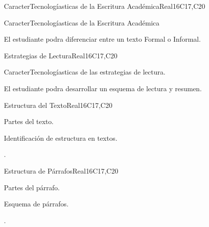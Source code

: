 \begin{syllabus}
\begin{unit}{CaracterTecnologíasticas de la Escritura Académica}{}{Real}{16}{C17,C20}
  \begin{topics}
      \item CaracterTecnologíasticas de la Escritura Académica
  \end{topics}

  \begin{learningoutcomes}
   \item El estudiante podra diferenciar entre un texto Formal o Informal.
  \end{learningoutcomes}
\end{unit}

\begin{unit}{Estrategias de Lectura}{}{Real}{16}{C17,C20}
  \begin{topics}
      \item CaracterTecnologíasticas de las estrategias de lectura.
  \end{topics}

  \begin{learningoutcomes}
   \item El estudiante podra desarrollar  un esquema de lectura y resumen.
  \end{learningoutcomes}
\end{unit}

\begin{unit}{Estructura del Texto}{}{Real}{16}{C17,C20}
  \begin{topics}
      \item Partes del texto.
      \item Identificación de estructura en textos.
  \end{topics}

  \begin{learningoutcomes}
   \item .%
  \end{learningoutcomes}
\end{unit}

\begin{unit}{Estructura de Párrafos}{}{Real}{16}{C17,C20}
  \begin{topics}
      \item Partes del párrafo.
      \item Esquema de párrafos.
  \end{topics}

  \begin{learningoutcomes}
   \item .%
  \end{learningoutcomes}
\end{unit}


\end{syllabus}
